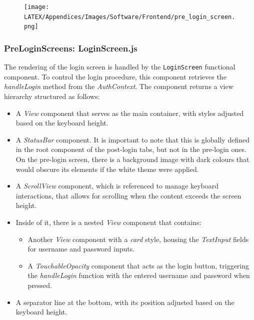 \begin{figure}[!ht]
    \centering
    \texttt{[image: LATEX/Appendices/Images/Software/Frontend/pre\_login\_screen.png]}
    \label{fig:pre login screen}
\end{figure}

\newpage
\subsubsection{PreLoginScreens: LoginScreen.js}

The rendering of the login screen is handled by the \texttt{LoginScreen} functional component. To control the login procedure, this component retrieves the \textit{handleLogin} method from the \textit{AuthContext}. The component returns a view hierarchy structured as follows:

\begin{itemize}
    \item A \textit{View} component that serves as the main container, with styles adjusted based on the keyboard height.
    \item A \textit{StatusBar} component. It is important to note that this is globally defined in the root component of the post-login tabs, but not in the pre-login ones. On the pre-login screen, there is a background image with dark colours that would obscure its elements if the white theme were applied.
    \item A \textit{ScrollView} component, which is referenced to manage keyboard interactions, that allows for scrolling when the content exceeds the screen height.
    \item Inside of it, there is a nested \textit{View} component that contains:
    \begin{itemize}
        \item Another \textit{View} component with a \textit{card} style, housing the \textit{TextInput} fields for username and password inputs.
        \item A \textit{TouchableOpacity} component that acts as the login button, triggering the \textit{handleLogin} function with the entered username and password when pressed.
    \end{itemize}
    \item A separator line at the bottom, with its position adjusted based on the keyboard height.
\end{itemize}

